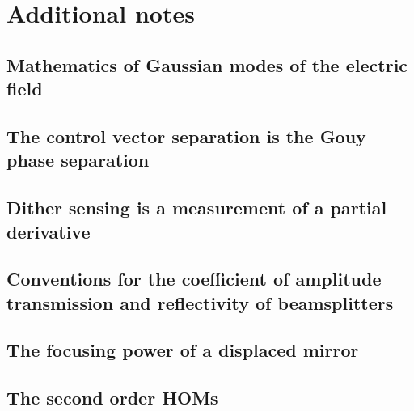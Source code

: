 \chapter{Additional notes}

\section{Mathematics of Gaussian modes of the electric field}

\label{ap:HGmode}

\section{The control vector separation is the Gouy phase separation}

\section{Dither sensing is a measurement of a partial derivative}

\section{Conventions for the coefficient of amplitude transmission and reflectivity of beamsplitters}

\section{The focusing power of a displaced mirror}

\section{The second order HOMs}

